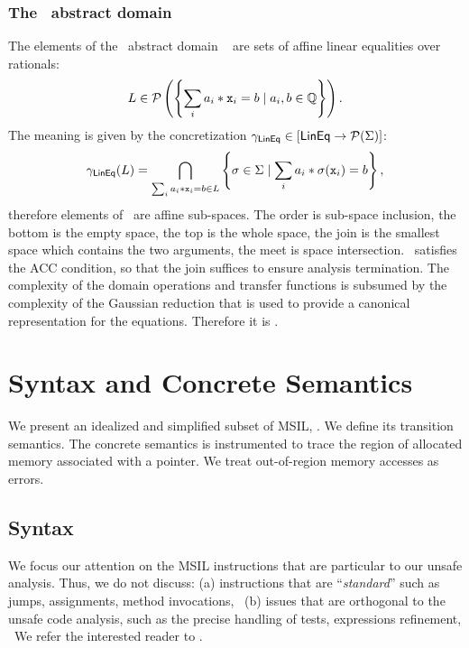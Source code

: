 \documentclass[10pt]{sigplanconf}
\newcommand{\mafcomment}[1]{{}}
\begin{document}
\subsubsection*{The \Karr\ abstract domain}
The elements of the \Karr\ abstract domain ~\cite{Karr76,MuellerOlmSeidl04} are sets of affine linear equalities over rationals: 
\[
L \in \mathcal{P}\left(\left\{ \sum_{i}a_i * \mathtt{x}_i = b \mid a_i, b \in \mathbb{Q} \right\} \right).
\]
The meaning is given by the concretization $\gamma_{\mathsf{LinEq}} \in [\mathsf{LinEq} \rightarrow\mathcal{P}{(\Sigma)}]$:
\[
\gamma_{\mathsf{LinEq}}(L) = \bigcap_{\sum_{i}a_i * \mathtt{x}_i = b \in L} \left\{ \sigma \in \Sigma \mid \sum_{i} a_i * \sigma(\mathtt{x}_i) = b \right\},
\]
therefore elements of \Karr\ are affine sub-spaces.
The order is  sub-space inclusion, the bottom is the empty space, the top is the whole space, the join is the smallest space which contains the two arguments,  the meet is space intersection.
\Karr\ satisfies the ACC condition, so that the join suffices to ensure analysis termination.
\mafcomment{MAF: these two sentences don't really explain much and I
  opted for dropping them.
The transfer functions for the assignment: (a) when involving linear expressions, constraints the abstract state (taking care of destructive updates); (b) otherwise, it simply drops the assigned variable.
The transfer function for the boolean guards is similar.}
The complexity of the domain operations and transfer functions is subsumed by the complexity of the Gaussian reduction that is used to provide a canonical representation for the equations. 
Therefore it is .


\section{Syntax and Concrete Semantics}

We present an idealized and simplified subset of MSIL, \uMSIL.
We define its  transition semantics.  
The concrete semantics is instrumented to trace the region of allocated memory associated with a pointer. 
We treat out-of-region  memory accesses as errors.

\subsection{Syntax}
We focus our attention on the MSIL instructions that are particular to
our unsafe analysis.  Thus, we do not discuss: (a) instructions that
are ``\emph{standard}'' such as jumps, assignments, method
invocations, \etc \ (b) issues that are orthogonal to the unsafe code
analysis, such as the precise handling of tests, expressions
refinement, \etc\ We refer the interested reader to
\cite{LogozzoMaf08-2}.
\end{document}
